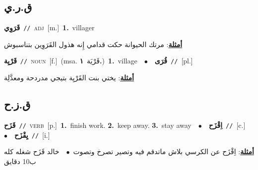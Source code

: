 \documentclass[10pt,a4paper,twoside]{article} %
\begin{document}
\begin{multicols}{2}
\vspace{-3mm}
\subsection*{\color{blue}\foreignlanguage{arabic}{ق.ر.ي}\color{blue}{}} 

{\setlength\topsep{0pt}\textbf{\foreignlanguage{arabic}{قَرَوِي}}\ {\color{gray}\texttt{//}\color{black}}\ \textsc{adj}\ [m.]\ \textbf{1.}~villager\  \begin{flushright}\color{gray}\foreignlanguage{arabic}{\textbf{\underline{\foreignlanguage{arabic}{أمثلة}}}: مرتك الحيوانة حكت قدامي إِنه هذول القَرَوِين بتناسبوش}\end{flushright}\color{black}} \vspace{2mm}

{\setlength\topsep{0pt}\textbf{\foreignlanguage{arabic}{قَرْيِة}}\ {\color{gray}\texttt{//}\color{black}}\ \textsc{noun}\ [f.]\ \color{gray}(msa. \foreignlanguage{arabic}{قَرْيَة}~\foreignlanguage{arabic}{\textbf{١.}})\color{black}\ \textbf{1.}~village\ \ $\bullet$\ \ \setlength\topsep{0pt}\textbf{\foreignlanguage{arabic}{قُرَى}}\ {\color{gray}\texttt{//}\color{black}}\ [pl.]\  \begin{flushright}\color{gray}\foreignlanguage{arabic}{\textbf{\underline{\foreignlanguage{arabic}{أمثلة}}}: يختي بنت القَرْيِة بتيجي مدردحة ومعدَّلِة}\end{flushright}\color{black}} \vspace{2mm}

\vspace{-3mm}
\subsection*{\color{blue}\foreignlanguage{arabic}{ق.ز.ح}\color{blue}{}} 

{\setlength\topsep{0pt}\textbf{\foreignlanguage{arabic}{قَزَح}}\ {\color{gray}\texttt{//}\color{black}}\ \textsc{verb}\ [p.]\ \textbf{1.}~finish work.  \textbf{2.}~keep away.  \textbf{3.}~stay away\ \ $\bullet$\ \ \setlength\topsep{0pt}\textbf{\foreignlanguage{arabic}{اِقْزَح}}\ {\color{gray}\texttt{//}\color{black}}\ [c.]\ \ $\bullet$\ \ \setlength\topsep{0pt}\textbf{\foreignlanguage{arabic}{يِقْزَح}}\ {\color{gray}\texttt{//}\color{black}}\ [i.]\  \begin{flushright}\color{gray}\foreignlanguage{arabic}{\textbf{\underline{\foreignlanguage{arabic}{أمثلة}}}: اِقْزَح عن الكرسي بلاش ماتدقم فيه وتصير تصرخ وتصوت\ $\bullet$\ \  خالد قَزَح شغله كله ب10 دقايق}\end{flushright}\color{black}} \vspace{2mm}


\end{multicols}
\end{document}
